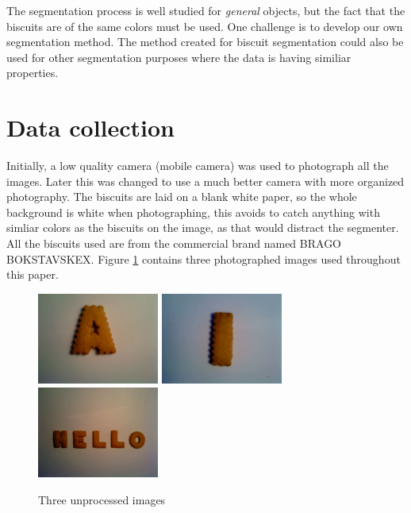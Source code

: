 \documentclass[a4paper,11pt]{article}
\begin{document}
The segmentation process is well studied for \emph{general} objects, but the fact that the biscuits are of the same colors must be used.
One challenge is to develop our own segmentation method.
The method created for biscuit segmentation could also be used for other segmentation purposes where the data is having similiar properties.

\section{Data collection}
Initially, a low quality camera (mobile camera) was used to photograph all the images.
Later this was changed to use a much better camera with more organized photography.
The biscuits are laid on a blank white paper, so the whole background is white when photographing, this avoids to catch anything with simliar colors as the biscuits on the image, as that would distract the segmenter.
All the biscuits used are from the commercial brand named BRAGO BOKSTAVSKEX.
Figure \ref{fig:unprocessed} contains three photographed images used throughout this paper.

\begin{figure}[]
\begin{center}
\includegraphics[width=40mm]{orig_a.JPG}
\includegraphics[width=40mm]{orig_i.JPG}
\includegraphics[width=40mm]{orig_word.JPG}
\end{center}
\caption{Three unprocessed images}
\label{fig:unprocessed}
\end{figure}
\end{document}
